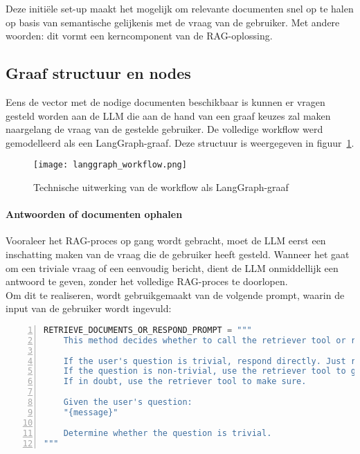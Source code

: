 Deze initiële set-up maakt het mogelijk om relevante documenten snel op te halen op basis van semantische gelijkenis met de vraag van de gebruiker. Met andere woorden: dit vormt een kerncomponent van de RAG-oplossing.

\subsection{Graaf structuur en nodes}

Eens de vector met de nodige documenten beschikbaar is kunnen er vragen gesteld worden aan de LLM die aan de hand van een graaf keuzes zal maken naargelang de vraag van de gestelde gebruiker. De volledige workflow werd gemodelleerd als een LangGraph-graaf. Deze structuur is weergegeven in figuur~\ref{fig:langgraph}.

\begin{figure}[H]
    \centering
    \texttt{[image: langgraph\_workflow.png]}
    \caption{Technische uitwerking van de workflow als LangGraph-graaf}
    \label{fig:langgraph}
\end{figure}

\paragraph{Antwoorden of documenten ophalen}

Vooraleer het RAG-proces op gang wordt gebracht, moet de LLM eerst een inschatting maken van de vraag die de gebruiker heeft gesteld. Wanneer het gaat om een triviale vraag of een eenvoudig bericht, dient de LLM onmiddellijk een antwoord te geven, zonder het volledige RAG-proces te doorlopen.
\\[1em]
Om dit te realiseren, wordt gebruikgemaakt van de volgende prompt, waarin de input van de gebruiker wordt ingevuld: 

\begin{lstlisting}[basicstyle=\small, frame=single, breaklines=true, postbreak=\mbox{\textcolor{red}{$\hookrightarrow$}\space}, escapeinside ={\%,}, escapechar={!}, numbers=left, language=Python, caption=Prompt retrieve or respond]
RETRIEVE_DOCUMENTS_OR_RESPOND_PROMPT = """
    This method decides whether to call the retriever tool or respond directly.
    
    If the user's question is trivial, respond directly. Just respond directly. Do not show your reasoning or thinking process.
    If the question is non-trivial, use the retriever tool to generate a response.
    If in doubt, use the retriever tool to make sure.
    
    Given the user's question:  
    "{message}"
    
    Determine whether the question is trivial. 
"""
\end{lstlisting}

